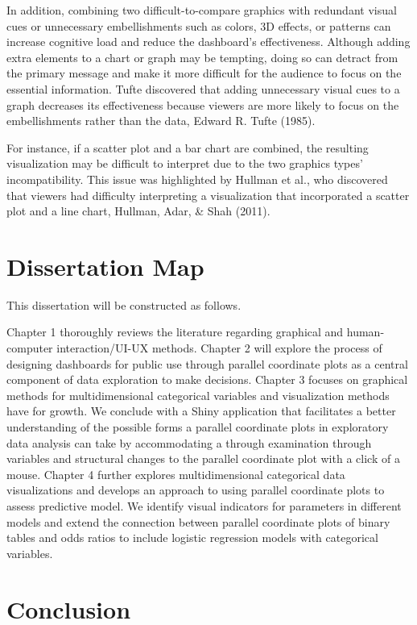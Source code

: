 \documentclass[print]{nuthesis}
\begin{document}
In addition, combining two difficult-to-compare graphics with redundant visual cues or unnecessary embellishments such as colors, 3D effects, or patterns can increase cognitive load and reduce the dashboard's effectiveness.
Although adding extra elements to a chart or graph may be tempting, doing so can detract from the primary message and make it more difficult for the audience to focus on the essential information.
Tufte discovered that adding unnecessary visual cues to a graph decreases its effectiveness because viewers are more likely to focus on the embellishments rather than the data, Edward R. Tufte (1985).

For instance, if a scatter plot and a bar chart are combined, the resulting visualization may be difficult to interpret due to the two graphics types' incompatibility.
This issue was highlighted by Hullman et al., who discovered that viewers had difficulty interpreting a visualization that incorporated a scatter plot and a line chart, Hullman, Adar, \& Shah (2011).

\hypertarget{dissertation-map}{%
\section{Dissertation Map}\label{dissertation-map}}

This dissertation will be constructed as follows.

Chapter 1 thoroughly reviews the literature regarding graphical and human-computer interaction/UI-UX methods.
Chapter 2 will explore the process of designing dashboards for public use through parallel coordinate plots as a central component of data exploration to make decisions.
Chapter 3 focuses on graphical methods for multidimensional categorical variables and visualization methods have for growth.
We conclude with a Shiny application that facilitates a better understanding of the possible forms a parallel coordinate plots in exploratory data analysis can take by accommodating a through examination through variables and structural changes to the parallel coordinate plot with a click of a mouse.
Chapter 4 further explores multidimensional categorical data visualizations and develops an approach to using parallel coordinate plots to assess predictive model.
We identify visual indicators for parameters in different models and extend the connection between parallel coordinate plots of binary tables and odds ratios to include logistic regression models with categorical variables.

\hypertarget{conclusion}{%
\section{Conclusion}\label{conclusion}}
\end{document}
